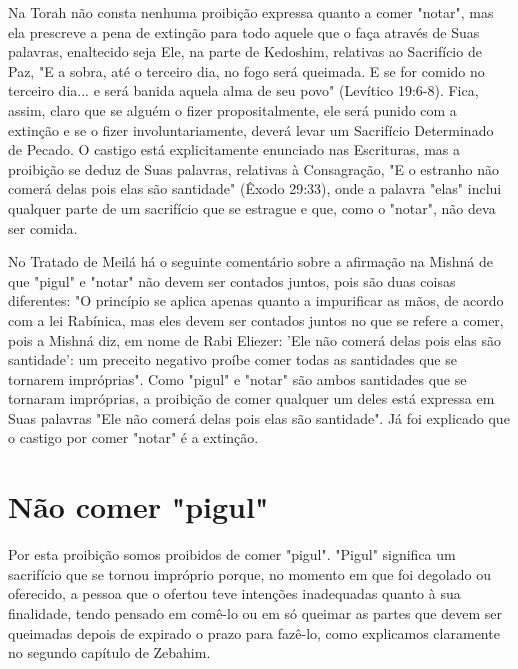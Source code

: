 \begin{itemize}
\begin{enumrate}
\begin{itemize}
\begin{itemize}
\begin{itemize}
Na Torah não consta nenhuma proibição expressa quanto a comer "notar",
mas ela prescreve a pena de extinção para todo aquele que o faça
atra­vés de Suas palavras, enaltecido seja Ele, na parte de Kedoshim,
relativas ao Sacrifício de Paz, "E a sobra, até o terceiro dia, no fogo
será queimada. E se for comido no terceiro dia... e será banida aquela
alma de seu povo" (Levítico 19:6-8). Fica, assim, claro que se alguém o
fizer propositalmente, ele será puni­do com a extinção e se o fizer
involuntariamente, deverá levar um Sacrifício Determinado de Pecado. O
castigo está explicitamente enunciado nas Escritu­ras, mas a proibição
se deduz de Suas palavras, relativas à Consagração, "E o estranho não
comerá delas pois elas são santidade" (Êxodo 29:33), onde a pala­vra
"elas" inclui qualquer parte de um sacrifício que se estrague e que,
como o "notar", não deva ser comida.

No Tratado de Meilá há o seguinte comentário sobre a afirmação na Mishná
de que "pigul" e "notar" não devem ser contados juntos, pois são duas
coisas diferentes: "O princípio se aplica apenas quanto a impurificar as
mãos, de acordo com a lei Rabínica, mas eles devem ser contados juntos
no que se refere a comer, pois a Mishná diz, em nome de Rabi Eliezer:
'Ele não comerá delas pois elas são santidade': um preceito negativo
proíbe comer todas as san­tidades que se tornarem impróprias". Como
"pigul" e "notar" são ambos san­tidades que se tornaram impróprias, a
proibição de comer qualquer um deles está expressa em Suas palavras "Ele
não comerá delas pois elas são santidade". Já foi explicado que o
castigo por comer "notar" é a extinção.

\section{Não comer "pigul"}

Por esta proibição somos proibidos de comer "pigul". "Pigul" sig­nifica
um sacrifício que se tornou impróprio porque, no momento em que foi
degolado ou oferecido, a pessoa que o ofertou teve intenções inadequadas
quan­to à sua finalidade, tendo pensado em comê-lo ou em só queimar as
partes que devem ser queimadas depois de expirado o prazo para fazê-lo,
como explica­mos claramente no segundo capítulo de Zebahim.


\end{itemize}
\end{itemize}
\end{itemize}
\end{enumrate}
\end{itemize}
